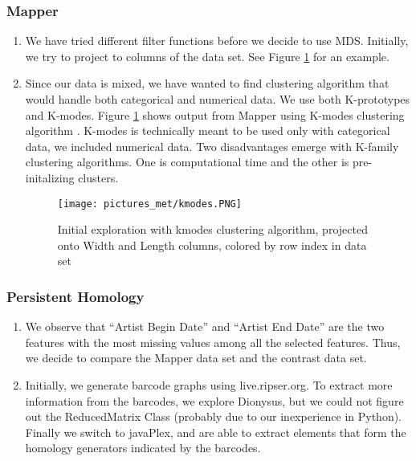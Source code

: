 \documentclass[12pt]{article}
\theoremstyle{definition}
\begin{document}
\subsubsection{Mapper}
\begin{enumerate}
\item We have tried different filter functions before we decide to use MDS. Initially, we try to project to columns of the data set. See Figure \ref{kmodes_pic} for an example. 
\item Since our data is mixed, we have wanted to find clustering algorithm that would handle both categorical and numerical data. We use both K-prototypes and K-modes. Figure \ref{kmodes_pic} shows output from Mapper using K-modes clustering algorithm \cite{Kmodes_Algorithm}. K-modes is technically meant to be used only with categorical data, we included numerical data. Two disadvantages emerge with K-family clustering algorithms. One is computational time and the other is pre-initalizing clusters. 
\begin{figure}
\texttt{[image: pictures\_met/kmodes.PNG]}
\caption{Initial exploration with kmodes clustering algorithm, projected onto Width and Length columns, colored by row index in data set}
\label{kmodes_pic}
\end{figure}
\end{enumerate}
\subsubsection{Persistent Homology}
\begin{enumerate}
\item We observe that ``Artist Begin Date'' and ``Artist End Date'' are the two features with the most missing values among all the selected features. Thus, we decide to compare the Mapper data set and the contrast data set.
\item Initially, we generate barcode graphs using live.ripser.org\cite{Ripser}. To extract more information from the barcodes, we explore Dionysus, but we could not figure out the ReducedMatrix Class (probably due to our inexperience in Python). Finally we switch to javaPlex, and are able to extract elements that form the homology generators indicated by the barcodes.
\end{enumerate}



\end{document}
